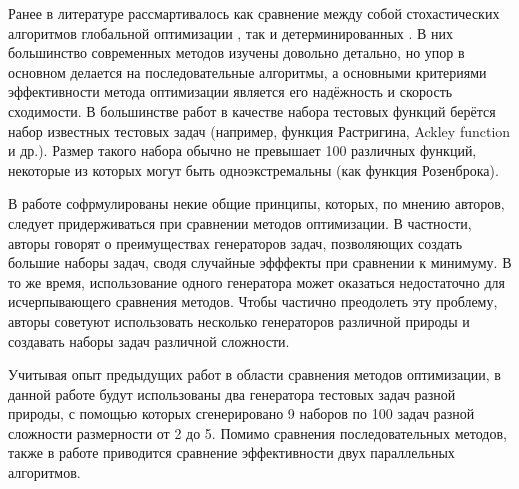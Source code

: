 \documentclass{svproc}
\begin{document}
\begin{Russian}
Ранее в литературе рассмартивалось как сравнение между собой стохастических алгоритмов глобальной оптимизации \cite{Ali2005, JSSv060i06}, так и детерминированных \cite{posik2012, KVASOV2018245, Liberti2005}.
В них большинство современных методов изучены довольно детально, но упор в основном делается на последовательные алгоритмы, а основными критериями эффективности метода оптимизации является его надёжность и скорость сходимости. В большинстве работ в качестве набора тестовых функций берётся набор известных тестовых задач (например, функция Растригина, Ackley function и др.). Размер такого набора обычно не превышает 100 различных функций, некоторые из которых могут быть одноэкстремальны (как функция Розенброка).

В работе \cite{Beiranvand2017} софрмулированы некие общие принципы, которых, по мнению авторов, следует придерживаться при сравнении методов оптимизации.
В частности, авторы говорят о преимуществах генераторов задач, позволяющих создать большие наборы задач, сводя случайные эфффекты при сравнении к минимуму. В то же время, использование одного генератора может оказаться недостаточно для исчерпывающего сравнения методов. Чтобы частично преодолеть эту проблему, авторы \cite{Beiranvand2017} советуют использовать несколько генераторов различной природы и создавать наборы задач различной сложности.

Учитывая опыт предыдущих работ в области сравнения методов оптимизации, в данной работе будут использованы два генератора тестовых задач разной природы, с помощью которых сгенерировано 9 наборов по 100 задач разной сложности размерности от 2 до 5. Помимо сравнения последовательных методов, также в работе приводится сравнение эффективности двух параллельных алгоритмов.
\end{Russian}
\end{document}
